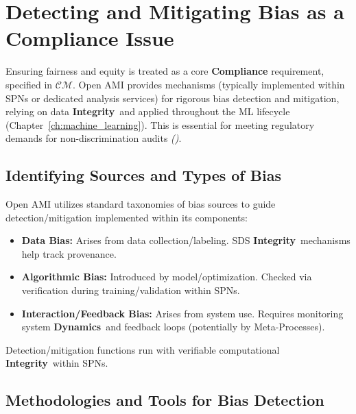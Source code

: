 \documentclass[12pt,a4paper]{report}
\renewcommand{\citep}[1]{\textit{\scriptsize{(\cite{#1})}}}
\newcommand{\Integrity}{\textbf{Integrity}}
\newcommand{\Dynamics}{\textbf{Dynamics}}
\begin{document}
	\section{Detecting and Mitigating Bias as a Compliance Issue} %
	\label{sec:5-4} %
	
	Ensuring fairness and equity is treated as a core \textbf{Compliance} requirement, specified in $\mathcal{CM}$. Open AMI provides mechanisms (typically implemented within SPNs or dedicated analysis services) for rigorous bias detection and mitigation, relying on data \Integrity\ and applied throughout the ML lifecycle (Chapter~\ref{ch:machine_learning}). This is essential for meeting regulatory demands for non-discrimination audits \citep{Navigating_AI_Conformity_2025}.
	
	\subsection{Identifying Sources and Types of Bias} %
	\label{sec:5-4-1} %
	
	Open AMI utilizes standard taxonomies of bias sources to guide detection/mitigation implemented within its components:
	\begin{itemize}
		\item \textbf{Data Bias:} Arises from data collection/labeling. SDS \Integrity\ mechanisms help track provenance.
		\item \textbf{Algorithmic Bias:} Introduced by model/optimization. Checked via verification during training/validation within SPNs.
		\item \textbf{Interaction/Feedback Bias:} Arises from system use. Requires monitoring system \Dynamics\ and feedback loops (potentially by Meta-Processes).
	\end{itemize}
	Detection/mitigation functions run with verifiable computational \Integrity\ within SPNs.
	
	\subsection{Methodologies and Tools for Bias Detection} %
	\label{sec:5-4-2} %
	
\end{document}
